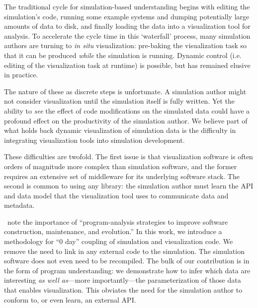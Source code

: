 
The traditional cycle for simulation-based understanding begins with
editing the simulation's code, running some example systems and dumping
potentially large amounts of data to disk, and finally loading the data
into a visualization tool for analysis.  To accelerate the cycle time
in this `waterfall' process, many simulation authors are turning to
\textit{in situ} visualization: pre-baking the visualization task so
that it can be
produced \emph{while} the simulation is running.  Dynamic control (i.e.
editing of the visualization task at runtime) is possible, but has
remained elusive in practice.

The nature of these as discrete steps is unfortunate.  A simulation
author might not consider visualization until the simulation
itself is fully written.  Yet the ability to \emph{see} the effect of
code modifications on the simulated data could have a profound effect
on the productivity of the simulation author.  We believe part of what
holds back dynamic visualization of simulation data is the difficulty
in integrating visualization tools into simulation development.

These difficulties are twofold.  The first issue is that visualization
software is often orders of magnitude more complex than simulation
software, and the former requires an extensive set of middleware for
its underlying software stack.  The second is common to using any
library: the simulation author must learn the API and data model that
the visualization tool uses to communicate data and metadata.

\cite{Hall:2009:Next50}~note the importance of ``program-analysis strategies to
improve software construction, maintenance, and evolution.''  In this
work, we introduce a methodology for ``0 day'' coupling of simulation
and visualization code.  We remove the need to link in any external
code to the simulation.  The simulation software does not even need to
be recompiled.  The bulk of our contribution is in the form of program
understanding: we demonstrate how to infer which data
are interesting \emph{as well as}---more importantly---the
parameterization of those data that enables visualization.  This
obviates the need for the simulation author to conform to, or even
learn, an external API.


